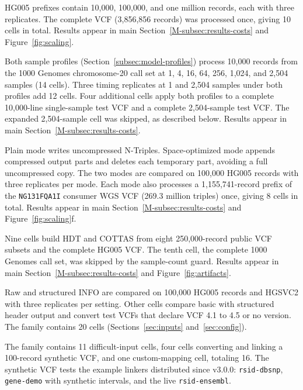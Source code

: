 \documentclass[11pt]{article}
\begin{document}
\begin{description}\setlength{\itemsep}{1pt}
\item[Records scaling (\texttt{04}).]
HG005 prefixes contain 10,000, 100,000, and one million records, each with three replicates.
The complete VCF (3,856,856 records) was processed once, giving 10 cells in total.
Results appear in main Section~\ref{M-subsec:results-costs} and Figure~\ref{fig:scaling}.
\item[Sample representation (\texttt{03}).]
Both sample profiles (Section~\ref{subsec:model-profiles}) process 10,000 records from the 1000 Genomes chromosome-20 call set at 1, 4, 16, 64, 256, 1,024, and 2,504 samples (14 cells).
Three timing replicates at 1 and 2,504 samples under both profiles add 12 cells.
Four additional cells apply both profiles to a complete 10,000-line single-sample test VCF and a complete 2,504-sample test VCF.
The expanded 2,504-sample cell was skipped, as described below.
Results appear in main Section~\ref{M-subsec:results-costs}.
\item[Storage mode (\texttt{01}).]
Plain mode writes uncompressed N-Triples.
Space-optimized mode appends compressed output parts and deletes each temporary part, avoiding a full uncompressed copy.
The two modes are compared on 100,000 HG005 records with three replicates per mode.
Each mode also processes a 1,155,741-record prefix of the \texttt{NG131FQA1I} consumer WGS VCF (269.3 million triples) once, giving 8 cells in total.
Results appear in main Section~\ref{M-subsec:results-costs} and Figure~\ref{fig:scaling}f.
\item[Corpus breadth (\texttt{05}).]
Nine cells build HDT and COTTAS from eight 250,000-record public VCF subsets and the complete HG005 VCF.
The tenth cell, the complete 1000 Genomes call set, was skipped by the sample-count guard.
Results appear in main Section~\ref{M-subsec:results-costs} and Figure~\ref{fig:artifacts}.
\item[Representation axes (\texttt{07}).]
Raw and structured INFO are compared on 100,000 HG005 records and HGSVC2 with three replicates per setting.
Other cells compare basic with structured header output and convert test VCFs that declare VCF 4.1 to 4.5 or no version.
The family contains 20 cells (Sections~\ref{sec:inputs} and~\ref{sec:config}).
\item[Difficult inputs (\texttt{09}).]
The family contains 11 difficult-input cells, four cells converting and linking a 100-record synthetic VCF, and one custom-mapping cell, totaling 16.
The synthetic VCF tests the example linkers distributed since v3.0.0: \texttt{rsid-dbsnp}, \texttt{gene-demo} with synthetic intervals, and the live \texttt{rsid-ensembl}.

\end{description}
\end{document}

